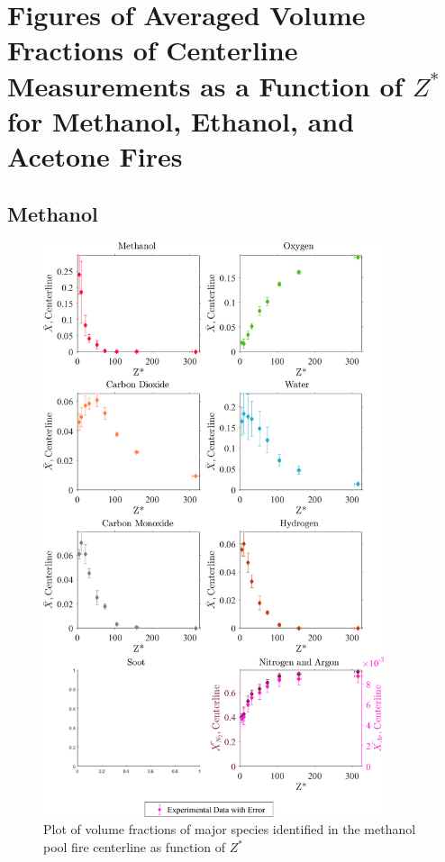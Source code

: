 \documentclass[12pt]{article}
\begin{document}
\pagebreak

\section{Figures of Averaged Volume Fractions of Centerline Measurements as a Function of $Z^{*}$ for Methanol, Ethanol, and Acetone Fires}\label{sec:Vol_Frac_Figs}

\subsection{Methanol}
\label{ssec:Methanol_ALL_Vol_Frac}
\begin{figure}[!h]
	\centering
\includegraphics[width=10.0cm,keepaspectratio]{Methanol_MOL_FRAC_Plot.png}
	\caption[Plot of volume fractions, with error, of major species identified in the methanol pool fire centerline as function of $Z^{*}$]{Plot of volume fractions of major species identified in the methanol pool fire centerline as function of $Z^{*}$}
	\label{fig:Methanol_VOL_Frac_Major}
\end{figure}
\pagebreak
\end{document}
